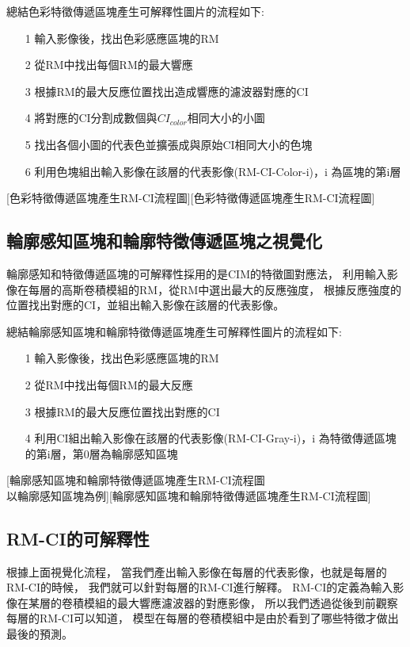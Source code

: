 \documentclass[class=NCU_thesis, crop=false]{standalone}
\begin{document}
	總結色彩特徵傳遞區塊產生可解釋性圖片的流程如下:
	\begin{itemize}
		\item [1]
		輸入影像後，找出色彩感應區塊的RM
		\item [2]
		從RM中找出每個RM的最大響應
		\item [3]
		根據RM的最大反應位置找出造成響應的濾波器對應的CI
		\item [4]
		將對應的CI分割成數個與$CI_{color}$相同大小的小圖
		\item [5]
		找出各個小圖的代表色並擴張成與原始CI相同大小的色塊
		\item [6]
		利用色塊組出輸入影像在該層的代表影像(RM-CI-Color-i)，i 為區塊的第i層
	\end{itemize}

	[色彩特徵傳遞區塊產生RM-CI流程圖][色彩特徵傳遞區塊產生RM-CI流程圖]
	\pagebreak

	\subsection{輪廓感知區塊和輪廓特徵傳遞區塊之視覺化}
	輪廓感知和特徵傳遞區塊的可解釋性採用的是CIM的特徵圖對應法，
	利用輸入影像在每層的高斯卷積模組的RM，從RM中選出最大的反應強度，
	根據反應強度的位置找出對應的CI，並組出輸入影像在該層的代表影像。

	總結輪廓感知區塊和輪廓特徵傳遞區塊產生可解釋性圖片的流程如下:
	\begin{itemize}
		\item [1]
		輸入影像後，找出色彩感應區塊的RM
		\item [2]
		從RM中找出每個RM的最大反應
		\item [3]
		根據RM的最大反應位置找出對應的CI
		\item [4]
		利用CI組出輸入影像在該層的代表影像(RM-CI-Gray-i)，i 為特徵傳遞區塊的第i層，第0層為輪廓感知區塊
	\end{itemize}

	[輪廓感知區塊和輪廓特徵傳遞區塊產生RM-CI流程圖 \\ 
	以輪廓感知區塊為例][輪廓感知區塊和輪廓特徵傳遞區塊產生RM-CI流程圖]

\pagebreak

	\subsection{RM-CI的可解釋性}
	根據上面視覺化流程，
	當我們產出輸入影像在每層的代表影像，也就是每層的RM-CI的時候，
	我們就可以針對每層的RM-CI進行解釋。
	RM-CI的定義為輸入影像在某層的卷積模組的最大響應濾波器的對應影像，
	所以我們透過從後到前觀察每層的RM-CI可以知道，
	模型在每層的卷積模組中是由於看到了哪些特徵才做出最後的預測。
\end{document}
